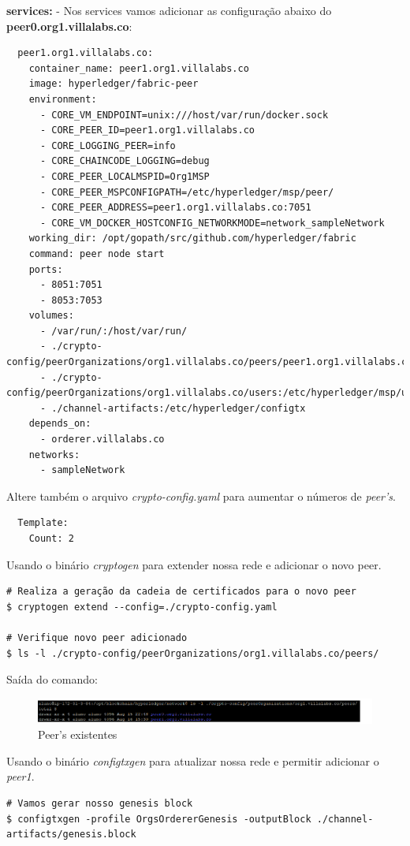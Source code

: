 \documentclass[a4paper,11pt]{article}
\begin{document}
\textbf{services:} - Nos services vamos adicionar as configuração abaixo do \textbf{peer0.org1.villalabs.co}:
\begin{lstlisting}
  peer1.org1.villalabs.co:
    container_name: peer1.org1.villalabs.co
    image: hyperledger/fabric-peer
    environment:
      - CORE_VM_ENDPOINT=unix:///host/var/run/docker.sock
      - CORE_PEER_ID=peer1.org1.villalabs.co
      - CORE_LOGGING_PEER=info
      - CORE_CHAINCODE_LOGGING=debug
      - CORE_PEER_LOCALMSPID=Org1MSP
      - CORE_PEER_MSPCONFIGPATH=/etc/hyperledger/msp/peer/
      - CORE_PEER_ADDRESS=peer1.org1.villalabs.co:7051
      - CORE_VM_DOCKER_HOSTCONFIG_NETWORKMODE=network_sampleNetwork
    working_dir: /opt/gopath/src/github.com/hyperledger/fabric
    command: peer node start
    ports:
      - 8051:7051
      - 8053:7053
    volumes:
      - /var/run/:/host/var/run/
      - ./crypto-config/peerOrganizations/org1.villalabs.co/peers/peer1.org1.villalabs.co/msp:/etc/hyperledger/msp/peer
      - ./crypto-config/peerOrganizations/org1.villalabs.co/users:/etc/hyperledger/msp/users
      - ./channel-artifacts:/etc/hyperledger/configtx
    depends_on:
      - orderer.villalabs.co
    networks:
      - sampleNetwork
\end{lstlisting}

Altere também o arquivo \textit{crypto-config.yaml} para aumentar o números de \textit{peer's}.
\begin{lstlisting}
  Template:
    Count: 2
\end{lstlisting}

Usando o binário \textit{cryptogen} para extender nossa rede e adicionar o novo peer.
\begin{lstlisting}
# Realiza a geração da cadeia de certificados para o novo peer
$ cryptogen extend --config=./crypto-config.yaml

# Verifique novo peer adicionado
$ ls -l ./crypto-config/peerOrganizations/org1.villalabs.co/peers/
\end{lstlisting}

Saída do comando:
\begin{figure}[H]
  \centering
  \includegraphics[width=1.1\textwidth]{imagens/output-cryptogen-extend.png}
  \caption{Peer's existentes}
\end{figure}

Usando o binário \textit{configtxgen} para atualizar nossa rede e permitir adicionar o \textit{peer1}.
\begin{lstlisting}
# Vamos gerar nosso genesis block
$ configtxgen -profile OrgsOrdererGenesis -outputBlock ./channel-artifacts/genesis.block
\end{lstlisting}
\end{document}
